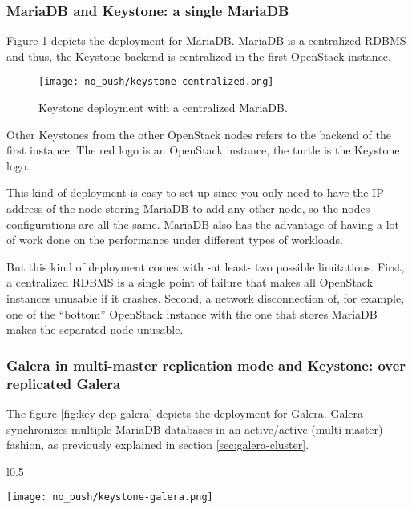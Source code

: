 \subsubsection{MariaDB and Keystone: a single MariaDB}


Figure \ref{fig:key-dep-centralized} depicts the deployment for MariaDB. MariaDB is a centralized RDBMS and thus, the Keystone backend is centralized in the first OpenStack instance.

\begin{figure}
  \begin{center}
    \texttt{[image: no\_push/keystone-centralized.png]}
  \end{center}
  \vspace{-20pt}
  \caption{Keystone deployment with a centralized MariaDB.}
  \vspace{-15pt}
  \label{fig:key-dep-centralized}
\end{figure}

 Other Keystones from the other OpenStack nodes refers to the backend of the first instance. The red logo is an OpenStack instance, the turtle is the Keystone logo.

This kind of deployment is easy to set up since you only need to have the IP address of the node storing MariaDB to add any other node, so the nodes configurations are all the same. MariaDB also has the advantage of having a lot of work done on the performance under different types of workloads.

But this kind of deployment comes with -at least- two possible limitations. First, a centralized RDBMS is a single point of failure that makes all OpenStack instances unusable if it crashes. Second, a network disconnection of, for example, one of the ``bottom'' OpenStack instance with the one that stores MariaDB makes the separated node unusable.



\subsubsection{Galera in multi-master replication mode and Keystone: over replicated Galera}
The figure \ref{fig:key-dep-galera} depicts the deployment for Galera. Galera synchronizes multiple MariaDB databases in an active/active (multi-master) fashion, as previously explained in section \ref{sec:galera-cluster}.

\begin{wrapfigure}{l}{0.5\textwidth}
  \vspace{-20pt}
  \begin{center}
    \texttt{[image: no\_push/keystone-galera.png]}
  \end{center}
  \vspace{-20pt}
  \caption{Keystone deployment with synchronized MariaDB instances thanks to Galera.}
  \vspace{-12pt}
  \label{fig:key-dep-galera}
\end{wrapfigure}

